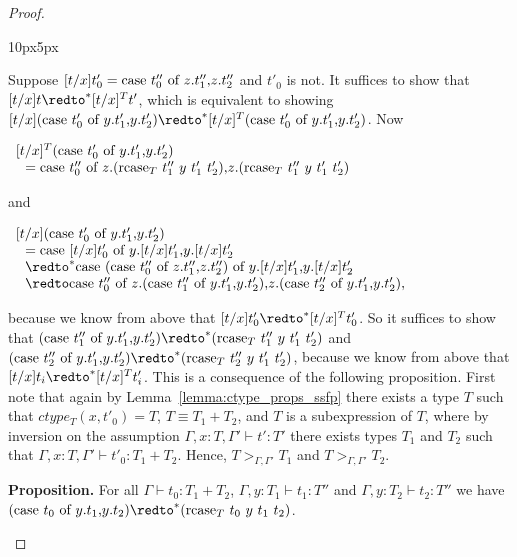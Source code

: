 \begin{proof}
\begin{changemargin}{10px}{5px}
\begin{itemize}
    Suppose $[t/x]t'_0 = \mbox{case}\ t''_0\ \text{of}\ z\text{.}t''_1\text{,}z\text{.}t''_2$ and $t'_0$ is not.  It suffices to show that 
    $[t/x]t \redto^* [t/x]^T t'$, which is equivalent to showing 
    $[t/x](\ccon{t'_0}{y}{t'_1}{t'_2}) \redto^* [t/x]^T (\ccon{t'_0}{y}{t'_1}{t'_2})$.  Now
    \begin{center}
      \begin{math}
        \begin{array}{lll}
          [t/x]^T (\mbox{case}\ t'_0\ \text{of}\ y\text{.}t'_1\text{,}y\text{.}t'_2)\\
          \,\,\,\,= \mbox{case}\ t''_0\ \text{of}\ z\text{.}(\mbox{rcase}_{T}\ t''_1\ y\ t'_1\ t'_2)\text{,}z\text{.}(\mbox{rcase}_{T}\ t''_1\ y\ t'_1\ t'_2)
        \end{array}
      \end{math}
    \end{center}
    and
    \begin{center}
      \begin{math}
        \begin{array}{lll}
          [t/x] (\ccon{t'_0}{y}{t'_1}{t'_2})\\
          \,\,\,\,= \ccon{[t/x]t'_0}{y}{[t/x]t'_1}{[t/x]t'_2} \\
          \,\,\,\,\redto^* \ccon{(\ccon{t''_0}{z}{t''_1}{t''_2})}{y}{[t/x]t'_1}{[t/x]t'_2} \\
          \,\,\,\,\redto \ccon{t''_0}{z}{(\ccon{t''_1}{y}{t'_1}{t'_2})}{(\ccon{t''_2}{y}{t'_1}{t'_2})},
        \end{array}
      \end{math}
    \end{center}
    because we know from above that $[t/x]t'_0 \redto^* [t/x]^T t'_0$.  So it suffices to show that
    $(\ccon{t''_1}{y}{t'_1}{t'_2}) \redto^* (\rcase{T}{t''_1}{y}{t'_1}{t'_2})$ and
    $(\ccon{t''_2}{y}{t'_1}{t'_2}) \redto^* (\rcase{T}{t''_2}{y}{t'_1}{t'_2})$, because we know from above that 
    $[t/x]t_i \redto^* [t/x]^T t'_i$.  This is a consequence of the following proposition.  First note that 
    again by Lemma~\ref{lemma:ctype_props_ssfp} there exists a type $T$ such that $ctype_T(x,t'_0) = T$,
    $T \equiv T_1+T_2$, and $T$ is a subexpression of $T$, where by inversion on the assumption
    $\Gamma,x:T,\Gamma' \vdash t':T'$ there exists types $T_1$ and $T_2$ such that 
    $\Gamma,x:T,\Gamma' \vdash t'_0:T_1+T_2$.  Hence, $T >_{\Gamma,\Gamma'} T_1$ and
    $T >_{\Gamma,\Gamma'} T_2$.  
    
    {\bf Proposition.} For all $\Gamma \vdash t_0:T_1+T_2$, $\Gamma,y:T_1 \vdash t_1:T''$ and
    $\Gamma,y:T_2 \vdash t_2:T''$ we have 
    $(\ccon{t_0}{y}{t_1}{t_2}) \redto^* (\rcase{T}{t_0}{y}{t_1}{t_2})$.


\end{itemize}
\end{changemargin}
\end{proof}
